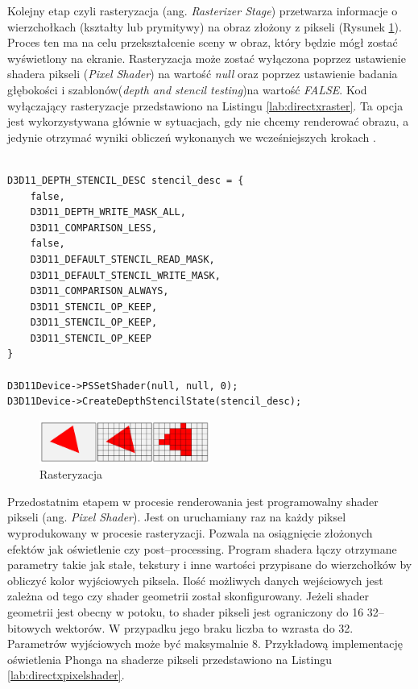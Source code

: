 \documentclass[archive]{mgr}
\begin{document}
Kolejny etap czyli rasteryzacja (ang. \emph{Rasterizer Stage}) przetwarza informacje o wierzchołkach (kształty lub prymitywy) na obraz złożony z pikseli (Rysunek \ref{lab:raster}). Proces ten ma na celu przekształcenie sceny w obraz, który będzie mógł zostać wyświetlony na ekranie. Rasteryzacja może zostać wyłączona poprzez ustawienie shadera pikseli (\emph{Pixel Shader}) na wartość \emph{null} oraz poprzez ustawienie badania głębokości i szablonów(\emph{depth and stencil testing})na wartość \emph{FALSE}. Kod wyłączający rasteryzacje przedstawiono na Listingu \ref{lab:directxraster}. Ta opcja jest wykorzystywana głównie w sytuacjach, gdy nie chcemy renderować obrazu, a jedynie otrzymać wyniki obliczeń wykonanych we wcześniejszych krokach \cite{DirectXRaster}.
\newpage
\begin{lstlisting}[caption={DirectX, Wyłączanie rasteryzacji},captionpos=b,label={lab:directxraster}]

D3D11_DEPTH_STENCIL_DESC stencil_desc = {
	false,
	D3D11_DEPTH_WRITE_MASK_ALL,
	D3D11_COMPARISON_LESS,
	false,
	D3D11_DEFAULT_STENCIL_READ_MASK,
	D3D11_DEFAULT_STENCIL_WRITE_MASK,
	D3D11_COMPARISON_ALWAYS,
	D3D11_STENCIL_OP_KEEP,
	D3D11_STENCIL_OP_KEEP,
	D3D11_STENCIL_OP_KEEP
}

D3D11Device->PSSetShader(null, null, 0);
D3D11Device->CreateDepthStencilState(stencil_desc);
\end{lstlisting}
\begin{figure}[h!]
  \centering
    \includegraphics[width=0.50\textwidth]{images/raster.png}
   \caption{Rasteryzacja}
   \label{lab:raster}
\end{figure}

Przedostatnim etapem w procesie renderowania jest programowalny shader pikseli (ang. \emph{Pixel Shader}). Jest on uruchamiany raz na każdy piksel wyprodukowany w procesie rasteryzacji. Pozwala na osiągnięcie złożonych efektów jak oświetlenie czy post–processing. Program shadera łączy otrzymane parametry takie jak stałe, tekstury i inne wartości przypisane do wierzchołków by obliczyć kolor wyjściowych piksela. Ilość możliwych danych wejściowych jest zależna od tego czy shader geometrii został skonfigurowany. Jeżeli shader geometrii jest obecny w potoku, to shader pikseli jest ograniczony do 16 32–bitowych wektorów. W przypadku jego braku liczba to wzrasta do 32. Parametrów wyjściowych może być maksymalnie 8. Przykładową implementację oświetlenia Phonga na shaderze pikseli przedstawiono na Listingu \ref{lab:directxpixelshader}.\\
\end{document}
